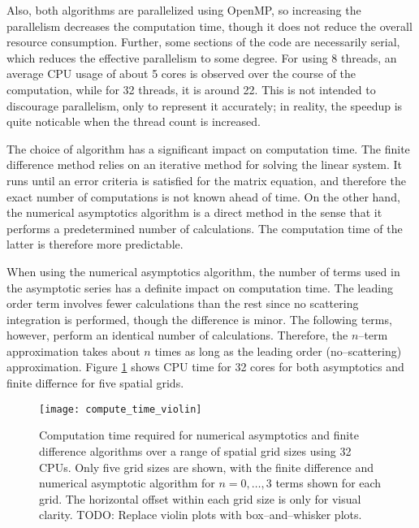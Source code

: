 Also, both algorithms are parallelized using OpenMP, so increasing the parallelism decreases the computation time, though it does not reduce the overall resource consumption. %
Further, some sections of the code are necessarily serial, which reduces the effective parallelism to some degree.
For using 8 threads, an average CPU usage of about 5 cores is observed over the course of the computation, while for 32 threads, it is around 22. %
This is not intended to discourage parallelism, only to represent it accurately; in reality, the speedup is quite noticable when the thread count is increased.

The choice of algorithm has a significant impact on computation time.
The finite difference method relies on an iterative method for solving the linear system.
It runs until an error criteria is satisfied for the matrix equation, and therefore the exact number of computations is not known ahead of time.
On the other hand, the numerical asymptotics algorithm is a direct method in the sense that it performs a predetermined number of calculations.
The computation time of the latter is therefore more predictable.

When using the numerical asymptotics algorithm, the number of terms used in the asymptotic series has a definite impact on computation time.
The leading order term involves fewer calculations than the rest since no scattering integration is performed, though the difference is minor.
The following terms, however, perform an identical number of calculations.
Therefore, the $n$--term approximation takes about $n$ times as long as the leading order (no--scattering) approximation.
Figure \ref{fig:compute_time_violin} shows CPU time for 32 cores for both asymptotics and finite differnce for five spatial grids.

\begin{figure}[h]
  \centering
  \texttt{[image: compute\_time\_violin]}
  \caption{Computation time required for numerical asymptotics and finite difference algorithms over a range of spatial grid sizes using 32 CPUs. Only five grid sizes are shown, with the finite difference and numerical asymptotic algorithm for $n=0,\ldots,3$ terms shown for each grid. The horizontal offset within each grid size is only for visual clarity. TODO: Replace violin plots with box--and--whisker plots.}
  \label{fig:compute_time_violin}
\end{figure}

